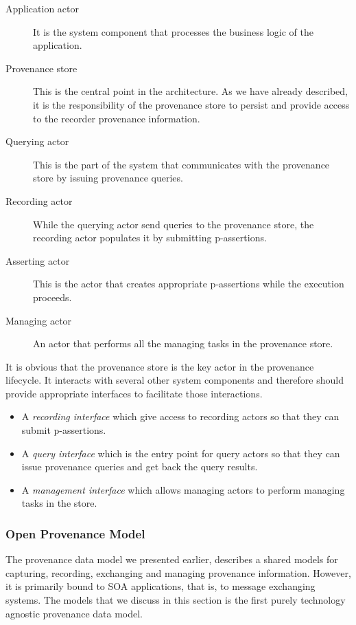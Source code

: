 \begin{description}
  \item[Application actor] 
        It is the system component that processes the business logic of the application.
  \item[Provenance store] 
        This is the central point in the architecture. As we have already described, it is the responsibility of the provenance store to persist and provide access to the recorder provenance information.
  \item[Querying actor] 
        This is the part of the system that communicates with the provenance store by issuing provenance queries.
  \item[Recording actor] 
        While the querying actor send queries to the provenance store, the recording actor populates it by submitting p-assertions. 
  \item[Asserting actor] 
        This is the actor that creates appropriate p-assertions while the execution proceeds.
  \item[Managing actor] 
        An actor that performs all the managing tasks in the provenance store.
\end{description}

It is obvious that the provenance store is the key actor in the provenance lifecycle. It interacts with several other system components and therefore should provide appropriate interfaces to facilitate those interactions.

\begin{itemize}
  \item 
        A \emph{recording interface} which give access to recording actors so that they can submit p-assertions.
  \item 
        A \emph{query interface} which is the entry point for query actors so that they can issue provenance queries and get back the query results.
  \item 
        A \emph{management interface} which allows managing actors to perform managing tasks in the store.
\end{itemize}

    
\subsubsection{Open Provenance Model}
The provenance data model we presented earlier, describes a shared models for capturing, recording, exchanging and managing provenance information. However, it is primarily bound to SOA applications, that is, to message exchanging systems. The models that we discuss in this section is the first purely technology agnostic provenance data model.

